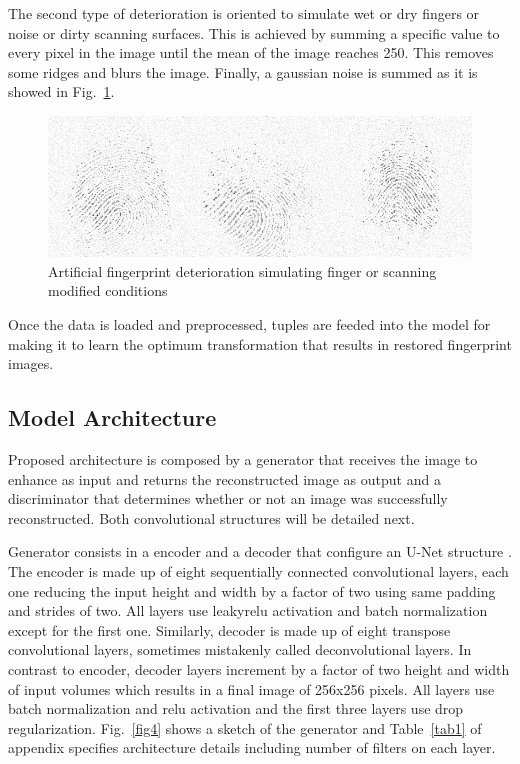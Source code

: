 \documentclass[a4paper,fleqn]{cas-dc}
\begin{document}
The second type of deterioration is oriented to simulate wet or dry fingers or noise or dirty scanning surfaces. This is achieved by summing a specific value to every pixel in the image until the mean of the image reaches 250. This removes some ridges and blurs the image. Finally, a gaussian noise is summed as it is showed in Fig.~\ref{fig3}.

\begin{figure}[htbp]
\centerline{\includegraphics[scale=0.32]{figs/deterioration_2.png}}
\caption{Artificial fingerprint deterioration simulating finger or scanning modified conditions}
\label{fig3}
\end{figure}

Once the data is loaded and preprocessed, tuples are feeded into the model for making it to learn the optimum transformation that results in restored fingerprint images.

\subsection{Model Architecture}
\label{sec:MA}

Proposed architecture is composed by a generator that receives the image to enhance as input and returns the reconstructed image as output and a discriminator that determines whether or not an image was successfully reconstructed. Both convolutional structures will be detailed next.

Generator consists in a encoder and a decoder that configure an U-Net structure \cite{UNBIS}. The encoder is made up of eight sequentially connected convolutional layers, each one reducing the input height and width by a factor of two using same padding and strides of two. All layers use leakyrelu activation and batch normalization except for the first one. Similarly, decoder is made up of eight transpose convolutional layers, sometimes mistakenly called deconvolutional layers. In contrast to encoder, decoder layers increment by a factor of two height and width of input volumes which results in a final image of 256x256 pixels. All layers use batch normalization and relu activation and the first three layers use drop regularization. Fig.~\ref{fig4} shows a sketch of the generator and Table~\ref{tab1} of appendix specifies architecture details including number of filters on each layer.
\end{document}
